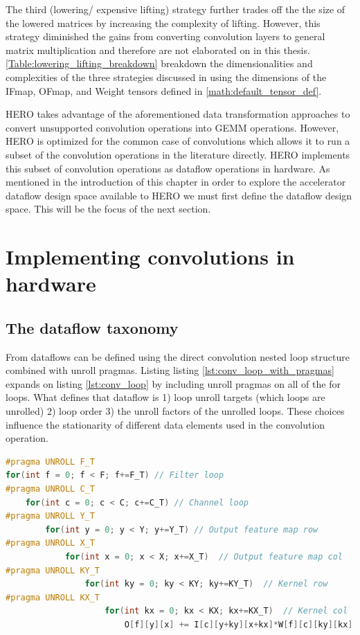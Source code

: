 The third (lowering/ expensive lifting) strategy further trades off the
the size of the lowered matrices by increasing the complexity of lifting.
However, this strategy diminished the gains from converting convolution layers
to general matrix multiplication and therefore are not elaborated on in this
thesis. \autoref{Table:lowering_lifting_breakdown} breakdown the
dimensionalities and complexities of the three strategies discussed in
\cite{cafe_con_troll} using the dimensions of the IFmap, OFmap, and Weight
tensors defined in \autoref{math:default_tensor_def}.

HERO takes advantage of the aforementioned data transformation approaches to
convert unsupported convolution operations into GEMM operations. However, HERO
is optimized for the common case of convolutions which allows it to run a subset
of the convolution operations in the literature directly. HERO implements this
subset of convolution operations as dataflow operations in hardware. As
mentioned in the introduction of this chapter in order to explore the
accelerator dataflow design space available to HERO we must first define the
dataflow design space. This will be the focus of the next section.  

    
\section{Implementing convolutions in hardware}
\subsection{The dataflow taxonomy}


From \cite{dnn_df_overrated} 
dataflows can be defined using the direct convolution
nested loop structure combined with unroll pragmas. Listing
listing \ref{lst:conv_loop_with_pragmas} expands on listing \ref{lst:conv_loop}
by including unroll pragmas on all of the for loops. What defines that dataflow is 1) loop unroll
targets (which loops are unrolled) 2) loop order 3) the unroll factors of the
unrolled loops. These choices influence the stationarity of different data
elements used in the convolution operation. 


\begin{minipage}{\linewidth}
    \begin{lstlisting}[language=C, caption=Convolution implemented as nested loops, label={lst:conv_loop_with_pragmas}]
#pragma UNROLL F_T
for(int f = 0; f < F; f+=F_T) // Filter loop
#pragma UNROLL C_T
    for(int c = 0; c < C; c+=C_T) // Channel loop
#pragma UNROLL Y_T
        for(int y = 0; y < Y; y+=Y_T) // Output feature map row
#pragma UNROLL X_T
            for(int x = 0; x < X; x+=X_T)  // Output feature map col
#pragma UNROLL KY_T
                for(int ky = 0; ky < KY; ky+=KY_T)  // Kernel row
#pragma UNROLL KX_T
                    for(int kx = 0; kx < KX; kx+=KX_T)  // Kernel col
                        O[f][y][x] += I[c][y+ky][x+kx]*W[f][c][ky][kx];
    \end{lstlisting}
\end{minipage}

